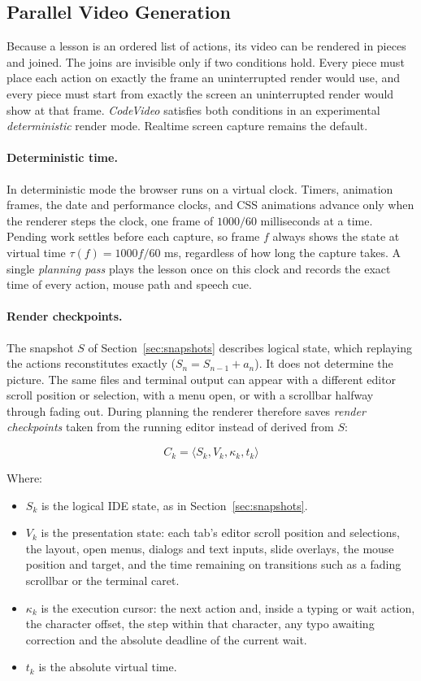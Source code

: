 \documentclass[11pt, a4paper]{article}
\begin{document}
\subsection{Parallel Video Generation}
\label{sec:parallel}

Because a lesson is an ordered list of actions, its video can be rendered in pieces and joined. The joins are invisible only if two conditions hold. Every piece must place each action on exactly the frame an uninterrupted render would use, and every piece must start from exactly the screen an uninterrupted render would show at that frame. \textit{CodeVideo} satisfies both conditions in an experimental \textit{deterministic} render mode. Realtime screen capture remains the default.

\paragraph{Deterministic time.} In deterministic mode the browser runs on a virtual clock. Timers, animation frames, the date and performance clocks, and CSS animations advance only when the renderer steps the clock, one frame of $1000/60$ milliseconds at a time. Pending work settles before each capture, so frame $f$ always shows the state at virtual time $\tau(f) = 1000f/60$ ms, regardless of how long the capture takes. A single \textit{planning pass} plays the lesson once on this clock and records the exact time of every action, mouse path and speech cue.

\paragraph{Render checkpoints.} The snapshot $S$ of Section~\ref{sec:snapshots} describes logical state, which replaying the actions reconstitutes exactly ($S_n = S_{n-1} + a_n$). It does not determine the picture. The same files and terminal output can appear with a different editor scroll position or selection, with a menu open, or with a scrollbar halfway through fading out. During planning the renderer therefore saves \textit{render checkpoints} taken from the running editor instead of derived from $S$:

\[
C_k = \langle S_k, V_k, \kappa_k, t_k \rangle
\]

Where:

\begin{itemize}
    \item \(S_k\) is the logical IDE state, as in Section~\ref{sec:snapshots}.
    \item \(V_k\) is the presentation state: each tab's editor scroll position and selections, the layout, open menus, dialogs and text inputs, slide overlays, the mouse position and target, and the time remaining on transitions such as a fading scrollbar or the terminal caret.
    \item \(\kappa_k\) is the execution cursor: the next action and, inside a typing or wait action, the character offset, the step within that character, any typo awaiting correction and the absolute deadline of the current wait.
    \item \(t_k\) is the absolute virtual time.
\end{itemize}
\end{document}

